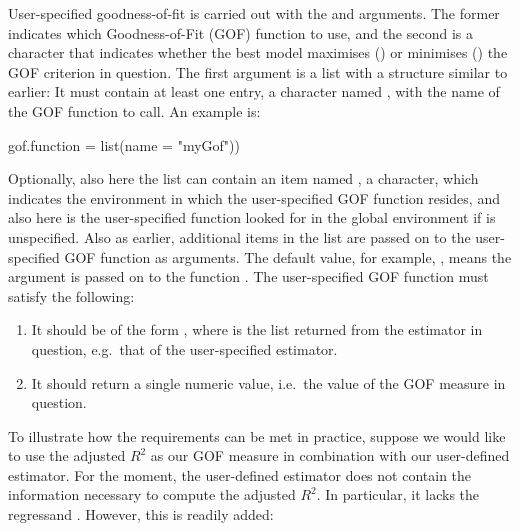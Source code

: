 User-specified goodness-of-fit is carried out with the  and  arguments. The former indicates which Goodness-of-Fit (GOF) function to use, and the second is a character that indicates whether the best model maximises ()  or minimises () the GOF criterion in question. The first argument is a list with a structure similar to earlier: It must contain at least one entry, a character named , with the name of the GOF function to call. An example is:
%
\begin{example}
  gof.function = list(name = "myGof"))
\end{example}
%
Optionally, also here the list can contain an item named , a character, which indicates the environment in which the user-specified GOF function resides, and also here is the user-specified function looked for in the global environment if  is unspecified. Also as earlier, additional items in the list are passed on to the user-specified GOF function as arguments. The default value, for example, , means the argument  is passed on to the function . The user-specified GOF function must satisfy the following:
%
\begin{enumerate}
	\item It should be of the form , where  is the list returned from the estimator in question, e.g.\ that of the user-specified estimator.
	
	\item It should return a single numeric value, i.e.\ the value of the GOF measure in question. 
\end{enumerate}
%
To illustrate how the requirements can be met in practice, suppose we would like to use the adjusted $R^2$ as our GOF measure in combination with our user-defined estimator. For the moment, the user-defined estimator  does not contain the information necessary to compute the adjusted $R^2$. In particular, it lacks the regressand . However, this is readily added:
%
